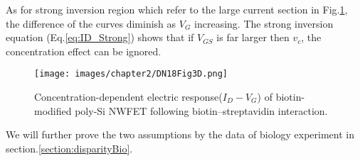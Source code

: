 As for strong inversion region which refer to the large current section in Fig.\ref{fig:DN17Fig6d}, the difference of the curves diminish as $V_G$ increasing.
The strong inversion equation (Eq.\ref{eq:ID_Strong}) shows that if $V_{GS}$ is far larger then $v_c$, the concentration effect can be ignored.

\begin{figure}[!htbp]
    \centering
    \texttt{[image: images/chapter2/DN18Fig3D.png]}
    \caption{Concentration-dependent electric response($I_D-V_G$) of biotin-modified poly-Si NWFET following biotin–streptavidin interaction.\cite{DN17}}
    \label{fig:DN17Fig6d}
\end{figure}

We will further prove the two assumptions by the data of biology experiment in section.\ref{section:disparityBio}.









%
